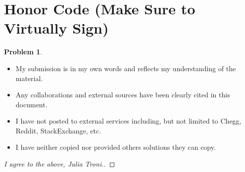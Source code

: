 \documentclass[11pt]{article}
\theoremstyle{definition}
\theoremstyle{definition}
\newtheorem{required}{Problem}
\theoremstyle{definition}
\begin{document}
\section{Honor Code (Make Sure to Virtually Sign)} \label{HonorCode}

\begin{required}
\begin{itemize}
\item My submission is in my own words and reflects my understanding of the material.
\item Any collaborations and external sources have been clearly cited in this document.
\item I have not posted to external services including, but not limited to Chegg, Reddit, StackExchange, etc.
\item I have neither copied nor provided others solutions they can copy.
\end{itemize}

\end{required}

\begin{proof}[I agree to the above, Julia  Troni.]
\end{proof}




\newpage
\end{document}
